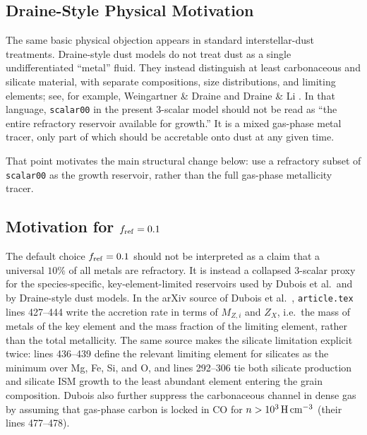 \documentclass[11pt]{article}
\begin{document}
\subsection{Draine-Style Physical Motivation}

The same basic physical objection appears in standard interstellar-dust treatments. Draine-style dust models do not treat dust as a single undifferentiated ``metal'' fluid. They instead distinguish at least carbonaceous and silicate material, with separate compositions, size distributions, and limiting elements; see, for example, Weingartner \& Draine \cite{WeingartnerDraine2001} and Draine \& Li \cite{DraineLi2007}. In that language, \texttt{scalar00} in the present 3-scalar model should not be read as ``the entire refractory reservoir available for growth.'' It is a mixed gas-phase metal tracer, only part of which should be accretable onto dust at any given time.

That point motivates the main structural change below: use a refractory subset of \texttt{scalar00} as the growth reservoir, rather than the full gas-phase metallicity tracer.

\subsection{Motivation for \texorpdfstring{$f_{\rm ref}=0.1$}{fref = 0.1}}

The default choice $f_{\rm ref}=0.1$ should not be interpreted as a claim that a universal $10\%$ of all metals are refractory. It is instead a collapsed 3-scalar proxy for the species-specific, key-element-limited reservoirs used by Dubois et al.\ and by Draine-style dust models. In the arXiv source of Dubois et al.\ \cite{Dubois2024}, \texttt{article.tex} lines 427--444 write the accretion rate in terms of $M_{Z,i}$ and $Z_X$, i.e.\ the mass of metals of the key element and the mass fraction of the limiting element, rather than the total metallicity. The same source makes the silicate limitation explicit twice: lines 436--439 define the relevant limiting element for silicates as the minimum over Mg, Fe, Si, and O, and lines 292--306 tie both silicate production and silicate ISM growth to the least abundant element entering the grain composition. Dubois also further suppress the carbonaceous channel in dense gas by assuming that gas-phase carbon is locked in CO for $n>10^3\,{\rm H\,cm^{-3}}$ (their lines 477--478).
\end{document}
